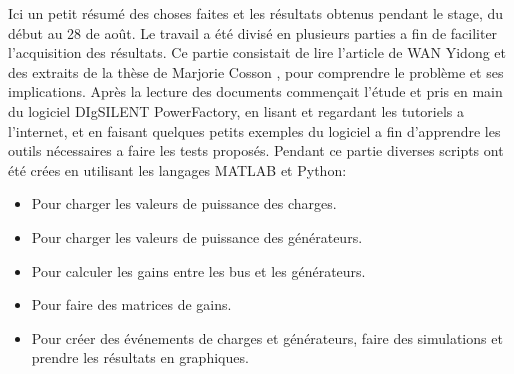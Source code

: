 \documentclass[a4paper,twoside]{article}
\begin{document}
\maketitle

Ici un petit résumé des choses faites et les résultats obtenus pendant le stage, du début au 28 de août.
Le travail a été divisé en plusieurs parties a fin de faciliter l'acquisition des résultats.
Ce partie consistait de lire l'article de WAN Yidong \cite{yidong} et des extraits de la thèse de Marjorie  Cosson \cite{cosson:tel-01374469}, pour comprendre le problème et ses implications.
Après la lecture des documents commençait l'étude et pris en main du logiciel DIgSILENT PowerFactory, en lisant et regardant les tutoriels a l'internet, et en faisant quelques petits exemples du logiciel a fin d'apprendre les outils nécessaires a faire les tests proposés.
Pendant ce partie diverses scripts ont été crées en utilisant les langages MATLAB et Python:
\begin{itemize}
\item Pour charger les valeurs de puissance des charges.
\item Pour charger les valeurs de puissance des générateurs.
\item Pour calculer les gains entre les bus et les générateurs.
\item Pour faire des matrices de gains.
\item Pour créer des événements de charges et générateurs, faire des simulations et prendre les résultats en graphiques.
\end{itemize}


\end{document}
